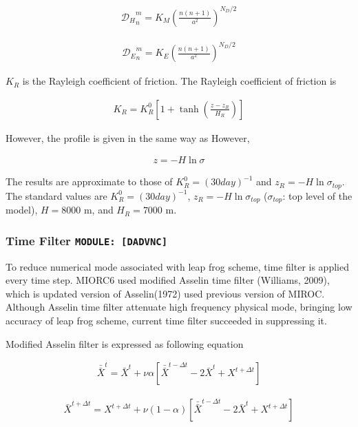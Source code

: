 \begin{eqnarray}
  {{\mathcal D}_H}_n^m = K_M \left( \frac{n(n+1)}{a^2} \right)^{N_D/2}
\end{eqnarray}

\begin{eqnarray}
  {{\mathcal D}_E}_n^m = K_E \left( \frac{n(n+1)}{a^2} \right)^{N_D/2}
\end{eqnarray}

\(K_R\) is the Rayleigh coefficient of friction. The Rayleigh
coefficient of friction is

\begin{eqnarray}
  K_R = K_R^0 \left[ 1+\tanh \left( \frac{z-z_R}{H_R} \right) \right]
\end{eqnarray}

However, the profile is given in the same way as However,

\begin{eqnarray}
  z = - H \ln \sigma
\end{eqnarray}

The results are approximate to those of \(K_R^0 = {(30day)}^{-1}\) and
\(z_R = -H \ln \sigma_{top}\). The standard values are
\(K_R^0 = {(30day)}^{-1}\), \(z_R = -H \ln \sigma_{top}\)
(\(\sigma_{top}\): top level of the model), \(H = 8000\) m, and
\(H_R = 7000\) m.

\hypertarget{time-filter-module-dadvnc}{%
\subsubsection{\texorpdfstring{Time Filter
\texttt{MODULE:\ {[}DADVNC{]}}}{Time Filter MODULE: {[}DADVNC{]}}}\label{time-filter-module-dadvnc}}

To reduce numerical mode associated with leap frog scheme, time filter
is applied every time step. MIORC6 used modified Asselin time filter
(Williams, 2009), which is updated version of Asselin(1972) used
previous version of MIROC. Although Asselin time filter attenuate high
frequency physical mode, bringing low accuracy of leap frog scheme,
current time filter succeeded in suppressing it.

Modified Asselin filter is expressed as following equation

\begin{eqnarray}
 \bar{\bar{X}}^t = \bar{X}^t + \nu\alpha[\bar{\bar{X}}^{t-\Delta t} -2 \bar{X}^t + X^{t+\Delta t}]
\end{eqnarray}

\begin{eqnarray}
 \bar{X}^{t+\Delta t} = X^{t+\Delta t} + \nu(1-\alpha)[\bar{\bar{X}}^{t-\Delta t} -2 \bar{X}^t + X^{t+\Delta t}]
\end{eqnarray}

